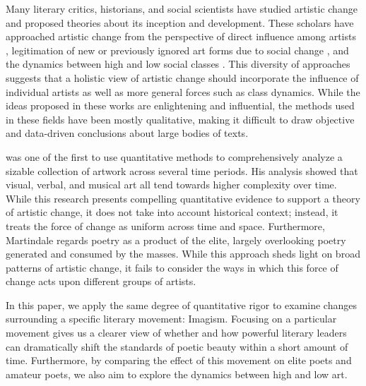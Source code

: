 \documentclass{book}
\begin{document}
Many literary critics, historians, and social scientists have studied artistic change and proposed theories about its inception and development. These scholars have approached artistic change from the perspective of direct influence among artists \citep{clayton1991influence},  legitimation of new or previously ignored art forms due to social change \citep{baumann2007general}, and the dynamics between high and low social classes \citep{simmel1957fashion}. This diversity of approaches suggests that a holistic view of artistic change should incorporate the influence of individual artists as well as more general forces such as class dynamics. While the ideas proposed in these works are enlightening and influential, the methods used in these fields have been mostly qualitative, making it difficult to draw objective and data-driven conclusions about large bodies of texts.

 \cite{martindale1990clockwork} was one of the first to use quantitative methods to comprehensively analyze a sizable collection of artwork across several time periods. His analysis showed that visual, verbal, and musical art all tend towards higher complexity over time. While this research presents compelling quantitative evidence to support a theory of artistic change, it does not take into account historical context; instead, it treats the force of change as uniform across time and space. Furthermore, Martindale regards poetry as a product of the elite, largely overlooking poetry generated and consumed by the masses. While this approach sheds light on broad patterns of artistic change, it fails to consider the ways in which this force of change acts upon different groups of artists.

In this paper, we apply the same degree of quantitative rigor to examine changes surrounding a specific literary movement: Imagism. Focusing on a particular movement gives us a clearer view of whether and how powerful literary leaders can dramatically shift the standards of poetic beauty within a short amount of time. Furthermore, by comparing the effect of this movement on elite poets and amateur poets, we also aim to explore the dynamics between high and low art. 

\end{document}
